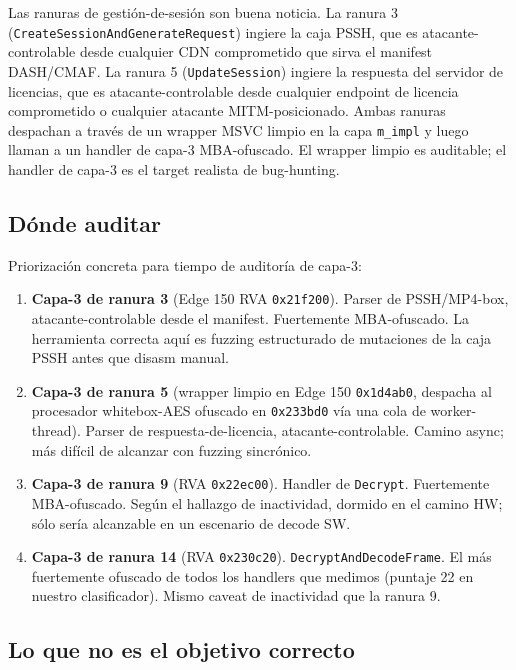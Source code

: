 \documentclass[11pt,letterpaper]{article}
\begin{document}
Las ranuras de gestión-de-sesión son buena noticia. La ranura 3
(\texttt{CreateSessionAndGenerateRequest}) ingiere la caja PSSH,
que es atacante-controlable desde cualquier CDN comprometido que
sirva el manifest DASH/CMAF. La ranura 5
(\texttt{UpdateSession}) ingiere la respuesta del servidor de
licencias, que es atacante-controlable desde cualquier endpoint
de licencia comprometido o cualquier atacante MITM-posicionado.
Ambas ranuras despachan a través de un wrapper MSVC limpio en la
capa \texttt{m\_impl} y luego llaman a un handler de capa-3
MBA-ofuscado. El wrapper limpio es auditable; el handler de
capa-3 es el target realista de bug-hunting.

\subsection{Dónde auditar}

Priorización concreta para tiempo de auditoría de capa-3:

\begin{enumerate}[itemsep=2pt]
  \item \textbf{Capa-3 de ranura 3} (Edge 150 RVA
        \texttt{0x21f200}). Parser de PSSH/MP4-box,
        atacante-controlable desde el manifest. Fuertemente
        MBA-ofuscado. La herramienta correcta aquí es fuzzing
        estructurado de mutaciones de la caja PSSH antes que
        disasm manual.
  \item \textbf{Capa-3 de ranura 5} (wrapper limpio en Edge 150
        \texttt{0x1d4ab0}, despacha al procesador whitebox-AES
        ofuscado en \texttt{0x233bd0} vía una cola de
        worker-thread). Parser de respuesta-de-licencia,
        atacante-controlable. Camino async; más difícil de
        alcanzar con fuzzing sincrónico.
  \item \textbf{Capa-3 de ranura 9} (RVA \texttt{0x22ec00}).
        Handler de \texttt{Decrypt}. Fuertemente MBA-ofuscado.
        Según el hallazgo de inactividad, dormido en el camino
        HW; sólo sería alcanzable en un escenario de decode SW.
  \item \textbf{Capa-3 de ranura 14} (RVA \texttt{0x230c20}).
        \texttt{DecryptAndDecodeFrame}. El más fuertemente
        ofuscado de todos los handlers que medimos (puntaje 22
        en nuestro clasificador). Mismo caveat de inactividad que
        la ranura 9.
\end{enumerate}

\subsection{Lo que no es el objetivo correcto}
\end{document}
